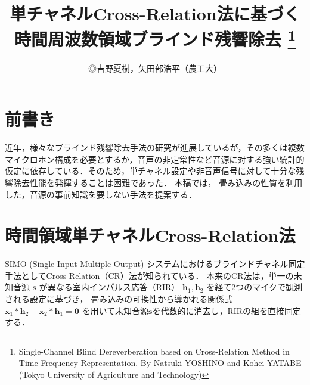 \documentclass[10pt,twocolumn,dvipdfmx]{jarticle} %
\title{
単チャネルCross-Relation法に基づく時間周波数領域ブラインド残響除去
\thanks{
   Single-Channel Blind Dereverberation based on Cross-Relation Method in Time-Frequency Representation. By  Natsuki YOSHINO and Kohei YATABE (Tokyo University of Agriculture and Technology)
  }
}
\author{◎吉野夏樹，矢田部浩平（農工大）}
\begin{document}
\maketitle

\section{前書き}
近年，様々なブラインド残響除去手法の研究が進展しているが，その多くは複数マイクロホン構成を必要とするか，音声の非定常性など音源に対する強い統計的仮定に依存している．そのため，単チャネル設定や非音声信号に対して十分な残響除去性能を発揮することは困難であった．
本稿では，
畳み込みの性質を利用した，音源の事前知識を要しない手法を提案する．

\section{時間領域単チャネルCross-Relation法}\label{sec:TDCR}
SIMO (Single-Input Multiple-Output) システムにおけるブラインドチャネル同定手法としてCross-Relation（CR）法が知られている\cite{li2018ctf}．
本来のCR法は，単一の未知音源 $\bm{s}$ が異なる室内インパルス応答（RIR） $\bm{h}_1, \bm{h}_2$ を経て2つのマイクで観測される設定に基づき，
畳み込みの可換性から導かれる関係式 $\bm{x}_1 \ast \bm{h}_2 - \bm{x}_2 \ast \bm{h}_1 = \bm{0}$ を用いて未知音源$\bm{s}$を代数的に消去し，RIRの組を直接同定する．
\end{document}
